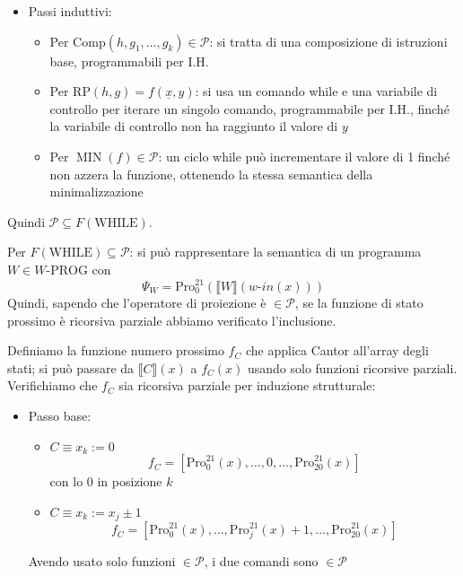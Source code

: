 \documentclass[12pt, answers]{exam}
\theoremstyle{plain}
\DeclareMathOperator{\MIN}{MIN}
\newcommand{\while}{\text{WHILE}}
\newcommand{\wprog}{W\text{-PROG}}
\newcommand{\comp}{\text{Comp}}
\newcommand{\rp}{\text{RP}}
\newcommand{\cp}{\mathcal{P}}
\newcommand{\pro}{\text{Pro}}
\newcommand{\win}{w\text{-}in}
\begin{document}
\begin{questions}
\begin{solution}
\begin{itemize}
                \item Passi induttivi: 
                \begin{itemize}
                    \item Per $\comp (h,g_1, \dots, g_k) \in \cp$: si tratta di una composizione di istruzioni base, programmabili per I.H.
                    
                    \item Per $\rp (h, g) = f(\underline{x}, y)$: si usa un comando while e una variabile di controllo per iterare un singolo comando, programmabile per I.H., finché la variabile di controllo non ha raggiunto il valore di $y$
                    
                    \item Per $\MIN(f) \in \cp$: un ciclo while può incrementare il valore di 1 finché non azzera la funzione, ottenendo la stessa semantica della minimalizzazione
                \end{itemize}
            \end{itemize}
            Quindi $\cp \subseteq F(\while)$.
            
            Per $F(\while) \subseteq \cp$: si può rappresentare la semantica di un programma $W \in \wprog$ con 
            $$ \Psi_W = \pro^{21}_0 (\llbracket W \rrbracket (\win (x))) $$
            Quindi, sapendo che l'operatore di proiezione è $\in \cp$, se la funzione di stato prossimo è ricorsiva parziale abbiamo verificato l'inclusione. 
            
            Definiamo la funzione numero prossimo $f_C$ che applica Cantor all'array degli stati; si può passare da $\llbracket C \rrbracket (x)$ a $f_C (x)$ usando solo funzioni ricorsive parziali. Verifichiamo che $f_C$ sia ricorsiva parziale per induzione strutturale: 
            \begin{itemize}
                \item Passo base:
                
                \begin{itemize}
                    \item $C \equiv x_k :=0$
                    $$ f_C = \left[ \pro^{21}_0 (x), \dots, 0, \dots, \pro^{21}_20 (x) \right] $$
                    con lo 0 in posizione $k$
                    
                    \item $C \equiv x_k := x_j \pm 1$
                    $$ f_C = \left[\pro^{21}_0 (x), \dots, \pro^{21}_j (x) + 1, \dots, \pro^{21}_20 (x) \right] $$
                \end{itemize}
                Avendo usato solo funzioni $\in \cp$, i due comandi sono $\in \cp$
                

\end{itemize}
\end{solution}
\end{questions}
\end{document}
